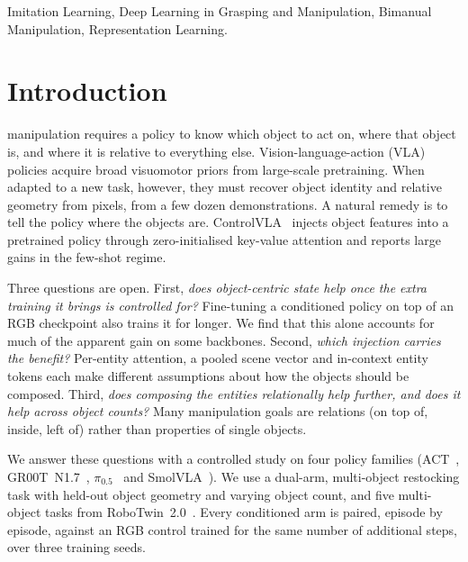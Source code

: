 \documentclass[letterpaper, 10pt, journal, twoside]{IEEEtran}
\begin{document}
\begin{IEEEkeywords}
Imitation Learning, Deep Learning in Grasping and Manipulation, Bimanual
Manipulation, Representation Learning.
\end{IEEEkeywords}

\section{Introduction}
\label{sec:intro}

 manipulation requires a policy to know which
object to act on, where that object is, and where it is relative to
everything else. Vision-language-action (VLA) policies
\cite{bjorck2025gr00t,pi05,shukor2025smolvla} acquire broad visuomotor priors
from large-scale pretraining. When adapted to a new task, however, they must
recover object identity and relative geometry from pixels, from a few dozen
demonstrations. A natural remedy is to tell the policy where the objects are.
ControlVLA~\cite{li2025controlvla} injects object features into a pretrained
policy through zero-initialised key-value attention and reports large gains
in the few-shot regime.

Three questions are open. First, \emph{does object-centric state help once
the extra training it brings is controlled for?} Fine-tuning a conditioned
policy on top of an RGB checkpoint also trains it for longer. We find that
this alone accounts for much of the apparent gain on some backbones. Second,
\emph{which injection carries the benefit?} Per-entity attention, a pooled
scene vector and in-context entity tokens each make different assumptions
about how the objects should be composed. Third, \emph{does composing the
entities relationally help further, and does it help across object counts?}
Many manipulation goals are relations (on top of, inside, left of) rather
than properties of single objects.

We answer these questions with a controlled study on four policy families
(ACT~\cite{zhao2023act}, GR00T~N1.7~\cite{bjorck2025gr00t},
$\pi_{0.5}$~\cite{pi05} and SmolVLA~\cite{shukor2025smolvla}). We use a
dual-arm, multi-object restocking task with held-out object geometry and
varying object count, and five multi-object tasks from
RoboTwin~2.0~\cite{chen2025robotwin2}. Every conditioned arm is paired,
episode by episode, against an RGB control trained for the same number of
additional steps, over three training seeds.
\end{document}
